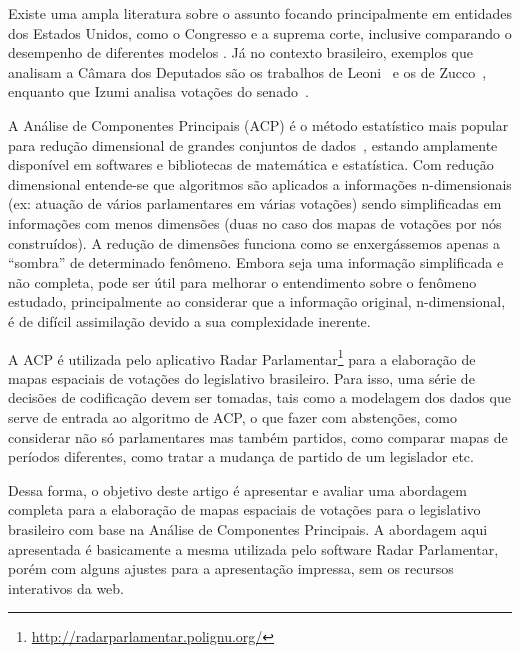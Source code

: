 \documentclass[
	article,			%
	12pt,				%
	oneside,			%
	a4paper,			%
	english,			%
	brazil,				%
	sumario=tradicional,
	oldfontcommands %
	]{abntex2}
\begin{document}
Existe uma ampla literatura sobre o assunto focando principalmente em entidades dos Estados Unidos, como o Congresso e a suprema corte, inclusive comparando o desempenho de diferentes modelos 
\cite{poole-rosenthal2000,clinton2004ideal,carroll2009comparing}.
Já no contexto brasileiro, exemplos que analisam a Câmara dos Deputados são os trabalhos de Leoni~\cite{leoni02cdep} e os de Zucco~\cite{zucco2011ideologia, zucco2011distinguishing}, enquanto que Izumi analisa votações do senado~\cite{izumi2016senado}. 

A Análise de Componentes Principais (ACP) é o método estatístico mais popular para redução dimensional de grandes conjuntos de dados~\cite{DataMining2003}, estando amplamente disponível em softwares e bibliotecas de matemática e estatística. Com redução dimensional entende-se que algoritmos são aplicados a informações n-dimensionais (ex: atuação de vários parlamentares em várias votações) sendo simplificadas em informações com menos dimensões (duas no caso dos mapas de votações por nós construídos). A redução de dimensões funciona como se enxergássemos apenas a ``sombra'' de determinado fenômeno. Embora seja uma informação simplificada e não completa, pode ser útil para melhorar o entendimento sobre o fenômeno estudado, principalmente ao considerar que a informação original, n-dimensional, é de difícil assimilação devido a sua complexidade inerente.

A ACP é utilizada pelo aplicativo Radar Parlamentar\footnote{\url{http://radarparlamentar.polignu.org/}} para a elaboração de mapas espaciais de votações do legislativo brasileiro. Para isso, uma série de decisões de codificação devem ser tomadas, tais como a modelagem dos dados que serve de entrada ao algoritmo de ACP, o que fazer com abstenções, como considerar não só parlamentares mas também partidos, como comparar mapas de períodos diferentes, como tratar a mudança de partido de um legislador etc. 

Dessa forma, o objetivo deste artigo é apresentar e avaliar uma abordagem completa para a elaboração de mapas espaciais de votações para o legislativo brasileiro com base na Análise de Componentes Principais. A abordagem aqui apresentada é basicamente a mesma utilizada pelo software Radar Parlamentar, porém com alguns ajustes para a apresentação impressa, sem os recursos interativos da web.
\end{document}
